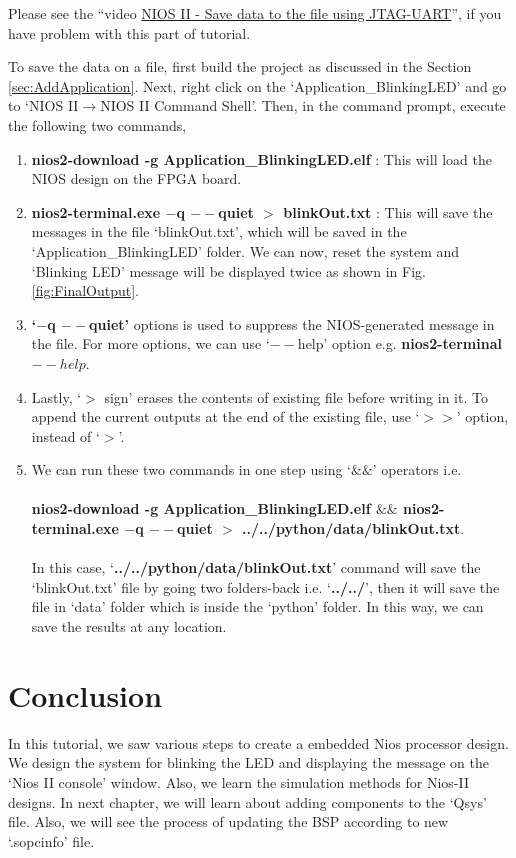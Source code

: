 Please see the ``video \href{https://www.youtube.com/playlist?list=PLpqu8JfoNKiNJpFvKTeBlI-LMzc2TAlRM}{NIOS II - Save data to the file using JTAG-UART}'', if you have problem with this part of tutorial. 

To save the data on a file, first build the project as discussed in the Section \ref{sec:AddApplication}. Next, right click on the `Application\_BlinkingLED' and go to `NIOS II$\rightarrow$NIOS II Command Shell'. Then, in the command prompt, execute the following two commands, 
\begin{enumerate}
	\item \textbf{nios2-download -g Application\_BlinkingLED.elf}  : This will load the NIOS design on the FPGA board. 
	
	\item \textbf{nios2-terminal.exe $-$q $--$quiet $>$ blinkOut.txt} : This will save the messages in the file `blinkOut.txt', which will be saved in the `Application\_BlinkingLED' folder. We can now, reset the system and `Blinking LED' message will be displayed twice as shown in Fig. \ref{fig:FinalOutput}. 
	\item \textbf{`$-$q $--$quiet'} options is used to suppress the NIOS-generated message in the file. For more options, we can use `$--$help' option e.g. \textbf{nios2-terminal $--help$}. 
	
	\item Lastly, `$>$ sign'  erases the contents of existing file before writing in it. To append the current outputs at the end of the existing file, use `$>>$' option, instead of `$>$'. 
	
	\item We can run these two commands in one step using `$\&\&$'  operators i.e. 
	\\
	\\
	\textbf{nios2-download -g Application\_BlinkingLED.elf $\&\&$  nios2-terminal.exe $-$q $--$quiet $>$ ../../python/data/blinkOut.txt}.
	\\
	\\
	In this case, `\textbf{../../python/data/blinkOut.txt}' command will save the `blinkOut.txt' file by going two folders-back i.e. `\textbf{../../}', then it will save the file in `data' folder which is inside the `python' folder. In this way, we can save the results at any location. 
	
\end{enumerate}


\section{Conclusion}
In this tutorial, we saw various steps to create a embedded Nios processor design. We design the system for blinking the LED and displaying the message on the `Nios II console' window. Also, we learn the simulation methods for Nios-II designs. In next chapter, we will learn about adding components to the `Qsys' file. Also, we will see the process of updating the BSP according to new `.sopcinfo' file. 
